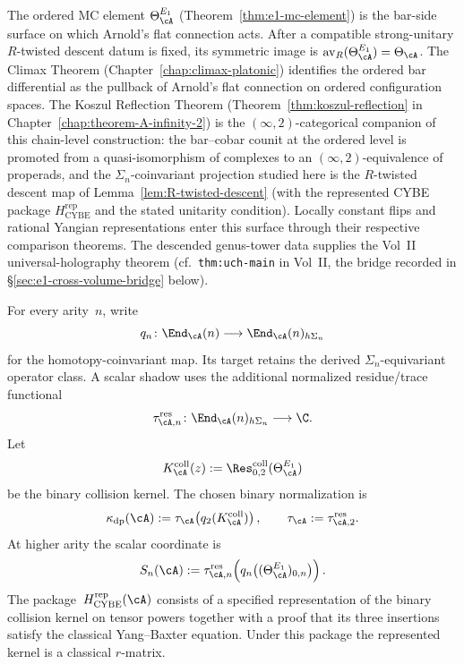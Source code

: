 \begin{remark}
\label{rem:e1-modular-bridge}
The ordered MC element $\Theta_\cA^{E_1}$
(Theorem~\ref{thm:e1-mc-element}) is the bar-side surface on which
Arnold's flat connection acts. After a compatible strong-unitary
$R$-twisted descent datum is fixed, its symmetric image is
$\operatorname{av}_R(\Theta_\cA^{E_1})=\Theta_\cA$. The Climax
Theorem (Chapter~\ref{chap:climax-platonic}) identifies the ordered
bar differential as the pullback of Arnold's flat connection on
ordered configuration spaces. The Koszul Reflection Theorem
(Theorem~\ref{thm:koszul-reflection} in
Chapter~\ref{chap:theorem-A-infinity-2}) is the
$(\infty,2)$-categorical companion of this chain-level construction:
the bar--cobar counit at the ordered level is promoted from a
quasi-isomorphism of complexes to an $(\infty,2)$-equivalence of
properads, and the $\Sigma_n$-coinvariant projection studied here is
the $R$-twisted descent map of Lemma~\ref{lem:R-twisted-descent}
(with the represented CYBE package
$H_{\mathrm{CYBE}}^{\mathrm{rep}}$ and the stated unitarity condition).
Locally constant flips and rational Yangian representations enter this
surface through their respective comparison theorems.
The descended genus-tower data supplies the Vol~II
universal-holography theorem
\textup{(}cf.\ \texttt{thm:uch-main} in Vol~II, the bridge recorded in
\S\ref{sec:e1-cross-volume-bridge} below\textup{)}.
\end{remark}

\begin{definition}
\label{def:e1-coinvariant-trace}
\ClaimStatusDefinitional
For every arity~$n$, write
\[
 q_n\colon \End_\cA(n)\longrightarrow
 \End_\cA(n)_{h\Sigma_n}
\]
for the homotopy-coinvariant map.  Its target retains the derived
$\Sigma_n$-equivariant operator class.  A scalar shadow uses the
additional normalized residue/trace functional
\[
 \tau_{\cA,n}^{\mathrm{res}}\colon
 \End_\cA(n)_{h\Sigma_n}\longrightarrow\C.
\]
Let
\[
 K_\cA^{\mathrm{coll}}(z)
 :=\Res^{\mathrm{coll}}_{0,2}(\Theta_\cA^{E_1})
\]
be the binary collision kernel.  The chosen binary normalization is
\[
 \kappa_{\mathrm{dp}}(\cA)
 :=\tau_\cA\!\left(q_2(K_\cA^{\mathrm{coll}})\right),
 \qquad
 \tau_\cA:=\tau_{\cA,2}^{\mathrm{res}}.
\]
At higher arity the scalar coordinate is
\[
 S_n(\cA)
 :=\tau_{\cA,n}^{\mathrm{res}}\!\left(
 q_n\bigl((\Theta_\cA^{E_1})_{0,n}\bigr)\right).
\]
The package~$H_{\mathrm{CYBE}}^{\mathrm{rep}}(\cA)$ consists of a
specified representation of the binary collision kernel on tensor
powers together with a proof that its three insertions satisfy the
classical Yang--Baxter equation.  Under this package the represented
kernel is a classical $r$-matrix.
\end{definition}

